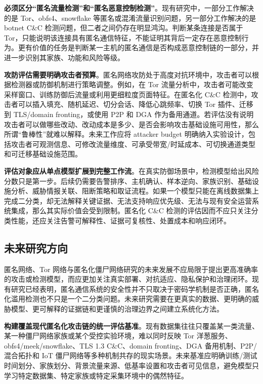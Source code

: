 \textbf{必须区分“匿名流量检测”和“匿名恶意控制检测”}。现有研究中，一部分工作解决的是 Tor、obfs4、snowflake 等匿名或混淆流量识别问题，另一部分工作解决的是 botnet C\&C 检测问题，但二者之间仍存在明显鸿沟\cite{liu2024anonymous,litpoti}。判断某条连接是否属于 Tor，只能说明该连接具有匿名通信特征，不能证明其背后一定存在恶意控制行为。更有价值的任务是判断某一主机的匿名通信是否构成恶意控制链的一部分，并进一步识别其家族、功能和风险等级。

\textbf{攻防评估需要明确攻击者预算}。匿名网络攻防处于高度对抗环境中，攻击者可以根据检测器或防御机制进行策略调整。例如，在 Tor 流量分析中，攻击者可能改变采样窗口、训练防御后流量或利用更细粒度页面特征。在匿名化 C\&C 检测中，攻击者可以插入填充、随机延迟、切分会话、降低心跳频率、切换 Tor 插件、迁移到 TLS/domain fronting，或使用 P2P 和 DGA 作为备用通道。若评估没有说明攻击者可以做哪些改动、改动成本是多少、是否会影响攻击基础设施可用性，那么所谓“鲁棒性”就难以解释。未来工作应将 attacker budget 明确纳入实验设计，包括攻击者可观测信息、可修改流量维度、可承受带宽/时延成本、可切换通道类型和可迁移基础设施范围。

\textbf{评估对象应从单点模型扩展到完整工作流}。在真实防御场景中，检测模型给出风险分数只是第一步。后续仍需要告警排序、主机确认、样本逆向、家族识别、基础设施分析、威胁情报关联、阻断策略和取证流程。如果一个模型只能在离线数据集上完成二分类，却无法解释关键证据、无法支持响应优先级、无法与现有安全运营系统集成，那么其实际价值会受到限制。匿名化 C\&C 检测的评估因而不应只关注分类性能，还应关注告警可解释性、证据可复核性、处置成本和响应闭环。

\subsection{未来研究方向}

匿名网络、Tor 网络与匿名化僵尸网络研究的未来发展不应局限于提出更高准确率的攻击或检测模型，而应更加关注真实部署、对抗适应、隐私保护和治理闭环。现有研究已经表明，匿名通信系统的安全性并不只取决于密码学机制是否正确，匿名化滥用检测也不只是一个二分类问题。未来研究需要在更真实的数据、更明确的威胁模型、更可解释的证据链和更谨慎的治理边界之间建立系统化方法。

\textbf{构建覆盖现代匿名化攻击链的统一评估基准}。现有数据集往往只覆盖某一类流量、某一种僵尸网络家族或某个受控实验环境，难以同时反映 Tor 洋葱服务、obfs4/meek/snowflake、TLS 1.3 C\&C、domain fronting、DGA 备用机制、P2P/混合拓扑和 IoT 僵尸网络等多种机制共存的现实场景。未来基准应明确训练/测试时间划分、家族划分、背景流量来源、低基率设置和攻击者可见信息，避免模型只学习特定数据集、特定家族或特定采集环境中的偶然特征。

